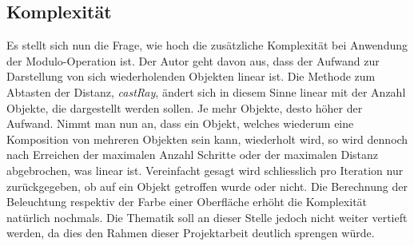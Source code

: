
\subsection{Komplexität}
\label{subsec:rendering:modulo:complexity}

Es stellt sich nun die Frage, wie hoch die zusätzliche Komplexität bei
Anwendung der Modulo-Operation ist. Der Autor geht davon aus, dass der Aufwand
zur Darstellung von sich wiederholenden Objekten linear ist. Die Methode zum
Abtasten der Distanz, \textit{castRay}, ändert sich in diesem Sinne linear mit
der Anzahl Objekte, die dargestellt werden sollen. Je mehr Objekte, desto höher
der Aufwand. Nimmt man nun an, dass ein Objekt, welches wiederum eine
Komposition von mehreren Objekten sein kann, wiederholt wird, so wird dennoch
nach Erreichen der maximalen Anzahl Schritte oder der maximalen Distanz
abgebrochen, was linear ist. Vereinfacht gesagt wird schliesslich pro Iteration
nur zurückgegeben, ob auf ein Objekt getroffen wurde oder nicht. Die Berechnung
der Beleuchtung respektiv der Farbe einer Oberfläche erhöht die Komplexität
natürlich nochmals.  Die Thematik soll an dieser Stelle jedoch nicht weiter
vertieft werden, da dies den Rahmen dieser Projektarbeit deutlich sprengen
würde.
